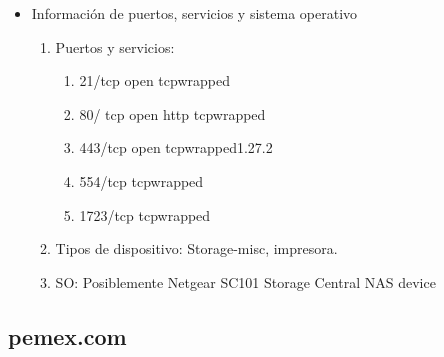 \begin{enumerate}
\begin{itemize}
        \item Información de puertos, servicios y sistema operativo
        
        \begin{enumerate}
            \item Puertos y servicios:
            \begin{enumerate}
                \item 21/tcp open tcpwrapped
                \item 80/ tcp open http tcpwrapped
                \item 443/tcp open tcpwrapped1.27.2
                \item 554/tcp tcpwrapped
                \item 1723/tcp tcpwrapped 
            \end{enumerate}

            \item Tipos de dispositivo: Storage-misc, impresora.
            \item SO: Posiblemente Netgear SC101 Storage Central NAS device
        \end{enumerate}
    \end{itemize}
\end{enumerate}

\subsection{pemex.com}

